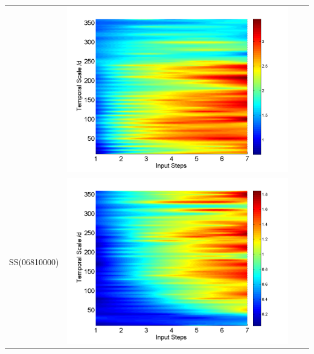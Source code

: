 \documentclass[draft,wrr]{AGUTeX}
\begin{document}
\begin{article}
\begin{table}[H]
\begin{tabular}{cccc}
&\begin{minipage}{.3\textwidth}\includegraphics[width=\linewidth]{resultgraph/11532500pepq.png}\end{minipage}
\\
SS(06810000)
&\begin{minipage}{.3\textwidth}\includegraphics[width=\linewidth]{resultgraph/06810000p.png}\end{minipage}

\end{tabular}
\end{table}
\end{article}
\end{document}
